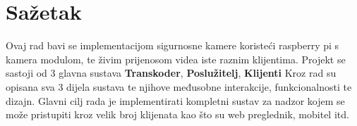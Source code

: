 \section*{Sažetak}
Ovaj rad bavi se implementacijom sigurnosne kamere koristeći raspberry pi s kamera modulom, 
te živim prijenosom videa iste raznim klijentima.
\paraBreak
Projekt se sastoji od 3 glavna sustava \textbf{Transkoder}, \textbf{Poslužitelj}, \textbf{Klijenti}
\paraBreak
Kroz rad su opisana sva 3 dijela sustava te njihove međusobne interakcije, funkcionalnosti te dizajn.
\paraBreak
Glavni cilj rada je implementirati kompletni sustav za nadzor kojem se može pristupiti kroz velik broj klijenata kao 
što su web preglednik, mobitel itd.

